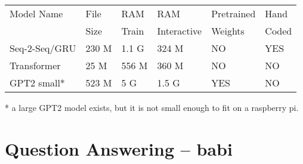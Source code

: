 \documentclass[english]{report}
\begin{document}
\begin{center}

\begin{table}[h!]
	
\begin{center}


\begin{tabular}{llllll}

	Model Name    & File  & RAM  & RAM  & Pretrained  & Hand  \\
	              &  Size & Train   & Interactive   & Weights & Coded   \\
	\hline
	\hline
	Seq-2-Seq/GRU & 230 M     & 1.1 G & 324 M & NO                 & YES        \\
	Transformer   & 25 M      & 556 M & 360 M & NO                 & NO         \\
	GPT2 small*   & 523 M     & 5 G   & 1.5 G & YES                & NO        \\
	\hline
\end{tabular}

* a large GPT2 model exists, but it is not small enough to fit on a raspberry pi.

	
\end{center}

\label{fig:modeloverview}
\end{table}
\end{center}


\iffalse
\section{Question Answering -- babi}
\end{document}
